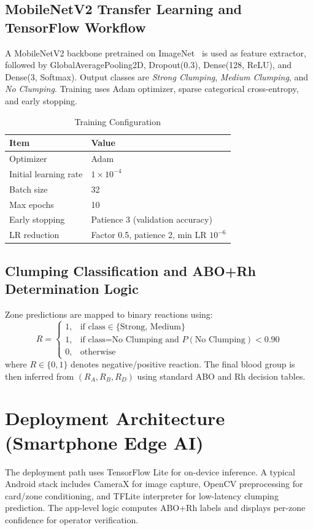 \documentclass[conference]{IEEEtran}
\begin{document}
\subsection{MobileNetV2 Transfer Learning and TensorFlow Workflow}
A MobileNetV2 backbone pretrained on ImageNet~\cite{sandler2018} is used as feature extractor, followed by GlobalAveragePooling2D, Dropout(0.3), Dense(128, ReLU), and Dense(3, Softmax). Output classes are \emph{Strong Clumping}, \emph{Medium Clumping}, and \emph{No Clumping}. Training uses Adam optimizer, sparse categorical cross-entropy, and early stopping.

\begin{table}[htbp]
  \caption{Training Configuration}
  \label{tab:training}
  \centering
  \begin{tabular}{ll}
    \toprule
    \textbf{Item} & \textbf{Value} \\
    \midrule
    Optimizer & Adam \\
    Initial learning rate & $1\times10^{-4}$ \\
    Batch size & 32 \\
    Max epochs & 10 \\
    Early stopping & Patience 3 (validation accuracy) \\
    LR reduction & Factor 0.5, patience 2, min LR $10^{-6}$ \\
    \bottomrule
  \end{tabular}
\end{table}

\subsection{Clumping Classification and ABO+Rh Determination Logic}
Zone predictions are mapped to binary reactions using:
\begin{equation}
R=
\begin{cases}
1, & \text{if class}\in\{\text{Strong, Medium}\} \\
1, & \text{if class=No Clumping and } P(\text{No Clumping})<0.90 \\
0, & \text{otherwise}
\end{cases}
\end{equation}
where $R\in\{0,1\}$ denotes negative/positive reaction. The final blood group is then inferred from $(R_A,R_B,R_D)$ using standard ABO and Rh decision tables.

\section{Deployment Architecture (Smartphone Edge AI)}
The deployment path uses TensorFlow Lite for on-device inference. A typical Android stack includes CameraX for image capture, OpenCV preprocessing for card/zone conditioning, and TFLite interpreter for low-latency clumping prediction. The app-level logic computes ABO+Rh labels and displays per-zone confidence for operator verification.
\end{document}
